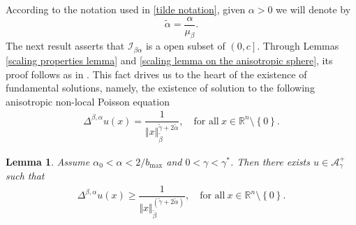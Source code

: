 \documentclass[10pt, leqno]{article}
\newtheorem{lemma}[theorem]{Lemma}
\theoremstyle{definition}
\theoremstyle{remark}
\numberwithin{equation}{section}
\begin{document}
According to the notation used in \eqref{tilde notation}, given $\alpha >0$ we will denote by
$$
\tilde{\alpha} = \dfrac{\alpha}{\mu_{\beta}}.
$$
The next result asserts that $\mathcal{I}_{\beta\alpha}$ is a open subset of $\left(0, c \right]$. Through Lemmas \ref{scaling properties lemma} and \ref{scaling lemma on the anisotropic sphere}, its proof follows as in \cite{CWW}. This fact drives us to the heart of the existence of fundamental solutions, namely, the existence of solution to the following anisotropic non-local Poisson equation
\begin{eqnarray}
\label{main supersolution previous}
\Delta^{\beta, \alpha} u (x) = \dfrac{1}{\Vert x \Vert_{\tilde{\beta}}^{\tilde{\gamma} + 2\tilde{\alpha}}}, \quad \text{for all} \ x \in \mathbb{R}^{n} \setminus \left\lbrace 0 \right\rbrace.
\end{eqnarray}
\begin{lemma}
\label{barrier lemma lemma 1}
Assume $ \alpha_{0} < \alpha < 2/b_{\max}$ and $0 < \gamma < \gamma^{\ast}$. Then there exists $u \in \mathcal{A}_{\gamma}^{+}$ such that
\begin{eqnarray}
\Delta^{\beta, \alpha} u (x) \geq \dfrac{1}{\Vert x \Vert_{\tilde{\beta}}^{\left( \tilde{\gamma} + 2\tilde{\alpha} \right)}}, \quad \text{for all} \ x \in \mathbb{R}^{n} \setminus \left\lbrace 0 \right\rbrace.
\end{eqnarray}
\end{lemma}
\end{document}
